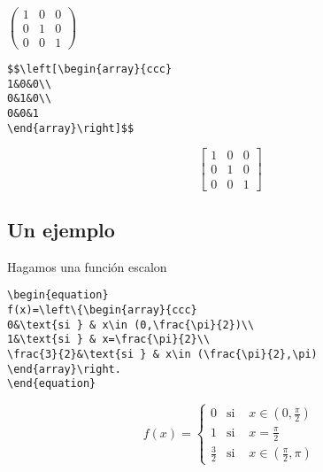 \documentclass{article}
\begin{document}
$\left(\begin{array}{ccc}
1&0&0\\
0&1&0\\
0&0&1
\end{array}\right)$

\begin{verbatim}
$$\left[\begin{array}{ccc}
1&0&0\\
0&1&0\\
0&0&1
\end{array}\right]$$
\end{verbatim}

$$\left[\begin{array}{ccc}
1&0&0\\
0&1&0\\
0&0&1
\end{array}\right]$$

\subsection{Un ejemplo}

Hagamos una función escalon

\begin{verbatim}
\begin{equation}
f(x)=\left\{\begin{array}{ccc}
0&\text{si } & x\in (0,\frac{\pi}{2})\\
1&\text{si } & x=\frac{\pi}{2}\\
\frac{3}{2}&\text{si } & x\in (\frac{\pi}{2},\pi)
\end{array}\right.
\end{equation}
\end{verbatim}

\begin{equation}
f(x)=\left\{\begin{array}{ccc}
0&\text{si } & x\in (0,\frac{\pi}{2})\\
1&\text{si } & x=\frac{\pi}{2}\\
\frac{3}{2}&\text{si } & x\in (\frac{\pi}{2},\pi)
\end{array}\right.
\end{equation}
\end{document}
